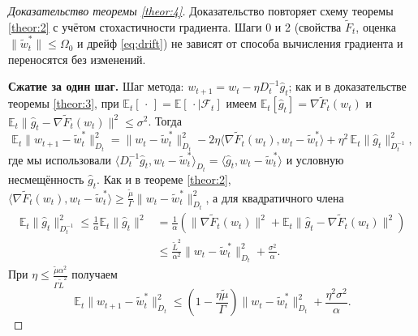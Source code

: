 \begin{proof}[Доказательство теоремы \ref{theor:4}]
Доказательство повторяет схему теоремы \ref{theor:2} с учётом стохастичности градиента. Шаги 0 и 2 (свойства $\widetilde{F}_t$, оценка $\|\widetilde{w}^*_t\| \le \Omega_0$ и дрейф \eqref{eq:drift}) не зависят от способа вычисления градиента и переносятся без изменений.

\textbf{Сжатие за один шаг.} Шаг метода: $w_{t+1} = w_t - \eta D_t^{-1}\widehat{g}_t$; как и в доказательстве теоремы \ref{theor:3}, при $\mathbb{E}_t[\,\cdot\,] = \mathbb{E}[\,\cdot \mid \mathcal{F}_t]$ имеем $\mathbb{E}_t[\widehat{g}_t] = \nabla \widetilde{F}_t(w_t)$ и $\mathbb{E}_t\|\widehat{g}_t - \nabla\widetilde{F}_t(w_t)\|^2 \le \sigma^2$. Тогда
\begin{equation*}
    \mathbb{E}_t\|w_{t+1}-\widetilde{w}^*_t\|_{D_t}^2 = \|w_t - \widetilde{w}^*_t\|_{D_t}^2 - 2 \eta \langle \nabla\widetilde{F}_t(w_t), w_t - \widetilde{w}^*_t \rangle + \eta^2\, \mathbb{E}_t\|\widehat{g}_t\|_{D_t^{-1}}^2,
\end{equation*}
где мы использовали $\langle D_t^{-1}\widehat{g}_t, w_t - \widetilde{w}^*_t\rangle_{D_t} = \langle \widehat{g}_t, w_t - \widetilde{w}^*_t\rangle$ и условную несмещённость $\widehat{g}_t$. Как и в теореме \ref{theor:2},
$\langle \nabla\widetilde{F}_t(w_t), w_t - \widetilde{w}^*_t \rangle \ge \frac{\widetilde{\mu}}{\Gamma}\|w_t - \widetilde{w}^*_t\|^2_{D_t}$, а для квадратичного члена
\begin{equation*}
\begin{split}
    \mathbb{E}_t\|\widehat{g}_t\|_{D_t^{-1}}^2 \le \frac{1}{\alpha}\mathbb{E}_t\|\widehat{g}_t\|^2 &= \frac{1}{\alpha}\left(\|\nabla\widetilde{F}_t(w_t)\|^2 + \mathbb{E}_t\|\widehat{g}_t - \nabla\widetilde{F}_t(w_t)\|^2\right) \\
    &\le \frac{\widetilde{L}^2}{\alpha^2}\|w_t - \widetilde{w}^*_t\|_{D_t}^2 + \frac{\sigma^2}{\alpha}.
\end{split}
\end{equation*}
При $\eta \le \frac{\widetilde{\mu}\alpha^2}{\Gamma\widetilde{L}^2}$ получаем
\begin{equation*}
    \mathbb{E}_t\|w_{t+1}-\widetilde{w}^*_t\|_{D_t}^2 \le \left(1 - \frac{\eta\widetilde{\mu}}{\Gamma}\right)\|w_t - \widetilde{w}^*_t\|_{D_t}^2 + \frac{\eta^2\sigma^2}{\alpha}.
\end{equation*}


\end{proof}
